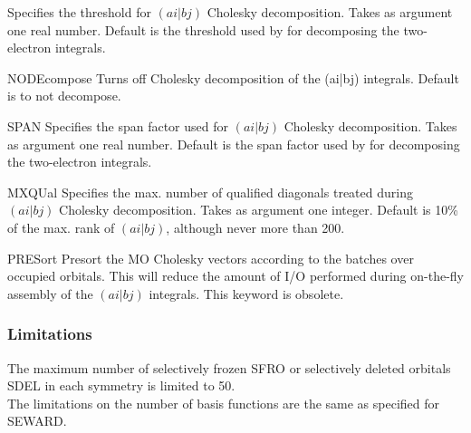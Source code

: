 \begin{keywordlist}
Specifies the threshold for $(ai|bj)$ Cholesky decomposition.
Takes as argument one real number.
Default is the threshold used by  for decomposing the two-electron
integrals.
\item[NODEcompose]
Turns off Cholesky decomposition of the (ai|bj) integrals.
Default is to not decompose.
\item[SPAN]
Specifies the span factor used for $(ai|bj)$ Cholesky decomposition.
Takes as argument one real number.
Default is the span factor used by  for decomposing the two-electron
integrals.
\item[MXQUal]
Specifies the max. number of qualified diagonals treated during $(ai|bj)$ Cholesky decomposition.
Takes as argument one integer.
Default is 10\% of the max. rank of $(ai|bj)$, although never more than 200.
\item[PRESort]
Presort the MO Cholesky vectors according to the batches over occupied orbitals.
This will reduce the amount of I/O performed during on-the-fly
assembly of the $(ai|bj)$ integrals.
This keyword is obsolete.
\end{keywordlist}

\subsubsection{Limitations}
The maximum number of selectively frozen
{\keyfont SFRO} or selectively deleted orbitals
{\keyfont SDEL} in each symmetry is limited to 50. \\
The limitations on the number of basis functions are the same as specified
for {\prgmfont SEWARD}.

